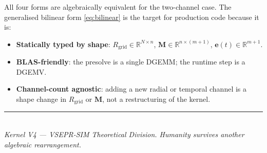 \documentclass[11pt, a4paper, oneside]{article}
\newcommand{\Rgrid}{R_{\mathrm{grid}}}
\newcommand{\Mmat}{\mathbf{M}}
\newcommand{\evec}{\mathbf{e}(t)}
\begin{document}
\vspace{1em}
\noindent
All four forms are algebraically equivalent for the two-channel case.
The generalised bilinear form \eqref{eq:bilinear} is the target for
production code because it is:

\begin{itemize}
  \item \textbf{Statically typed by shape}: $\Rgrid \in \mathbb{R}^{N \times n}$,
	$\Mmat \in \mathbb{R}^{n \times (m+1)}$, $\evec \in \mathbb{R}^{m+1}$.
  \item \textbf{BLAS-friendly}: the presolve is a single DGEMM;
	the runtime step is a DGEMV.
  \item \textbf{Channel-count agnostic}: adding a new radial or temporal
	channel is a shape change in $\Rgrid$ or $\Mmat$,
	not a restructuring of the kernel.
\end{itemize}

\vfill
\begin{center}
  \rule{0.4\textwidth}{0.4pt}\\[0.5em]
  \textit{Kernel V4 — VSEPR-SIM Theoretical Division.
  Humanity survives another algebraic rearrangement.}
\end{center}
\end{document}
